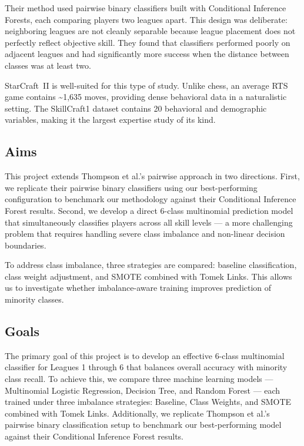 \documentclass[12pt, a4paper]{article}
\begin{document}
Their method used pairwise binary classifiers built with Conditional Inference Forests,
each comparing players two leagues apart. This design was deliberate: neighboring leagues
are not cleanly separable because league placement does not perfectly reflect objective
skill. They found that classifiers performed poorly on adjacent leagues and had
significantly more success when the distance between classes was at least two.

StarCraft~II is well-suited for this type of study. Unlike chess, an average RTS game
contains \textasciitilde1,635 moves, providing dense behavioral data in a naturalistic
setting. The SkillCraft1 dataset contains 20 behavioral and demographic variables, making
it the largest expertise study of its kind.

\subsection{Aims}

This project extends Thompson et al.'s pairwise approach in two directions. First, we
replicate their pairwise binary classifiers using our best-performing configuration to
benchmark our methodology against their Conditional Inference Forest results. Second,
we develop a direct 6-class multinomial prediction model that simultaneously classifies
players across all skill levels --- a more challenging problem that requires handling
severe class imbalance and non-linear decision boundaries.

To address class imbalance, three strategies are compared: baseline classification,
class weight adjustment, and SMOTE combined with Tomek Links. This allows us to
investigate whether imbalance-aware training improves prediction of minority classes.

\subsection{Goals}

The primary goal of this project is to develop an effective 6-class multinomial
classifier for Leagues 1 through 6 that balances overall accuracy with minority class
recall. To achieve this, we compare three machine learning models --- Multinomial Logistic
Regression, Decision Tree, and Random Forest --- each trained under three imbalance
strategies: Baseline, Class Weights, and SMOTE combined with Tomek Links. Additionally,
we replicate Thompson et al.'s pairwise binary classification setup to benchmark our
best-performing model against their Conditional Inference Forest results.
\end{document}
